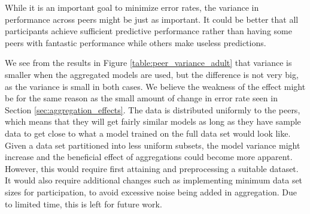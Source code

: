 While it is an important goal to minimize error rates, the variance in performance across peers might be just as important. It could be better that all participants achieve sufficient predictive performance rather than having some peers with fantastic performance while others make useless predictions.
 

We see from the results in Figure \ref{table:peer_variance_adult} that variance is smaller when the aggregated models are used, but the difference is not very big, as the variance is small in both cases. We believe the weakness of the effect might be for the same reason as the small amount of change in error rate seen in Section \ref{sec:aggregation_effects}. The data is distributed uniformly to the peers, which means that they will get fairly similar models as long as they have sample data to get close to what a model trained on the full data set would look like. Given a data set partitioned into less uniform subsets, the model variance might increase and the beneficial effect of aggregations could become more apparent. However, this would require first attaining and preprocessing a suitable dataset. It would also require additional changes such as implementing minimum data set sizes for participation, to avoid excessive noise being added in aggregation. Due to limited time, this is left for future work.

